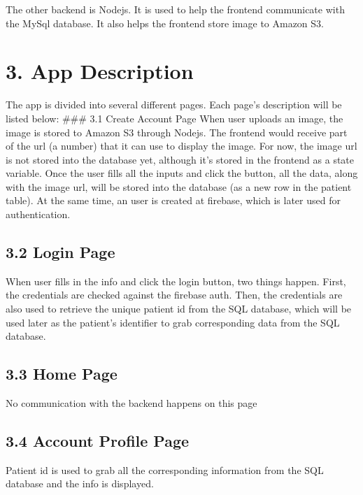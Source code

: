 \documentclass[]{book}
\begin{document}
The other backend is Nodejs. It is used to help the frontend communicate with the MySql database. It also helps the frontend store image to Amazon S3.

\hypertarget{app-description}{%
\section{3. App Description}\label{app-description}}

The app is divided into several different pages. Each page's description will be listed below:
\#\#\# 3.1 Create Account Page
When user uploads an image, the image is stored to Amazon S3 through Nodejs. The frontend would receive part of the url (a number) that it can use to display the image. For now, the image url is not stored into the database yet, although it's stored in the frontend as a state variable. Once the user fills all the inputs and click the button, all the data, along with the image url, will be stored into the database (as a new row in the patient table). At the same time, an user is created at firebase, which is later used for authentication.

\hypertarget{login-page}{%
\subsection{3.2 Login Page}\label{login-page}}

When user fills in the info and click the login button, two things happen. First, the credentials are checked against the firebase auth. Then, the credentials are also used to retrieve the unique patient id from the SQL database, which will be used later as the patient's identifier to grab corresponding data from the SQL database.

\hypertarget{home-page}{%
\subsection{3.3 Home Page}\label{home-page}}

No communication with the backend happens on this page

\hypertarget{account-profile-page}{%
\subsection{3.4 Account Profile Page}\label{account-profile-page}}

Patient id is used to grab all the corresponding information from the SQL database and the info is displayed.
\end{document}
